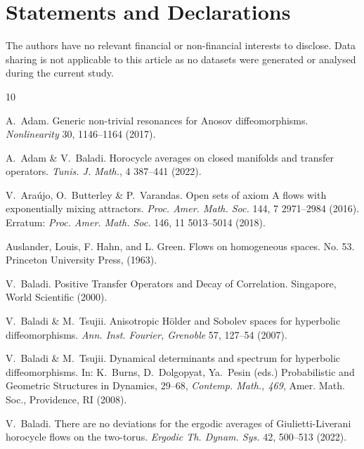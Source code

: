 \documentclass[a4paper,11pt]{amsart}
\theoremstyle{remark}
\begin{document}
\section*{Statements and Declarations}

\begin{small}
   The authors have no relevant financial or non-financial interests to disclose.
   Data sharing is not applicable to this article as no datasets were generated or analysed during the current study.
\end{small}


\begin{thebibliography}{10}

    A.~Adam.
    Generic non-trivial resonances for Anosov diffeomorphisms.
    \emph{Nonlinearity} 30, 1146--1164 (2017).

    A.~Adam \& V.~Baladi.
    Horocycle averages on closed manifolds and transfer operators.
    \emph{Tunis. J. Math.}, 4 387--441 (2022).
    
    V.~Araújo, O.~Butterley \& P.~Varandas.
    Open sets of axiom A flows with exponentially mixing attractors.
    \emph{Proc. Amer. Math. Soc.} 144, 7 2971--2984 (2016).
    Erratum: \emph{Proc. Amer. Math. Soc.} 146, 11 5013--5014 (2018).

    Auslander, Louis, F. Hahn, and L. Green.
    Flows on homogeneous spaces.
    No. 53. Princeton University Press, (1963).

    V.~Baladi.
    Positive Transfer Operators and Decay of Correlation.
    Singapore, World Scientific (2000).

    V.~Baladi \& M.~Tsujii.
    Anisotropic Hölder and Sobolev spaces for hyperbolic diffeomorphisms.
    \emph{Ann. Inst. Fourier, Grenoble} 57, 127--54 (2007).

    V.~Baladi \& M.~Tsujii.
    Dynamical determinants and spectrum for hyperbolic diffeomorphisms.
    In: K.~Burns, D.~Dolgopyat, Ya.~Pesin (eds.) Probabilistic and Geometric Structures in Dynamics, 29--68,
    \emph{Contemp. Math., 469}, Amer. Math. Soc., Providence, RI (2008).

    V.~Baladi.
    There are no deviations for the ergodic averages of Giulietti-Liverani horocycle flows on the two-torus.
    \emph{Ergodic Th. Dynam. Sys.} 42, 500--513 (2022).


\end{thebibliography}
\end{document}
